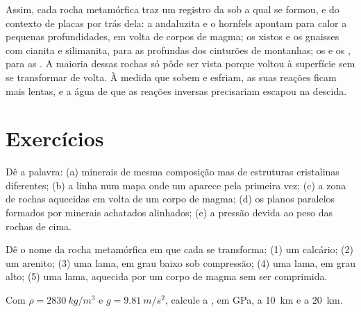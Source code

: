 Assim, cada rocha metamórfica traz um registro da  sob a qual se
formou, e do contexto de placas por trás dela: a andaluzita e o hornfels
apontam para calor a pequenas profundidades, em volta de corpos de magma; os
xistos e os gnaisses com cianita e silimanita, para as  profundas dos
cinturões de montanhas; os  e os , para as . A maioria dessas rochas só pôde ser vista porque voltou à
superfície sem se transformar de volta. À medida que sobem e esfriam, as
suas reações ficam mais lentas, e a água de que as reações inversas
precisariam escapou na descida.

\section{Exercícios}

\begin{exercise}[$\star$]\label{exo:g12:metamorphic-rocks:1}
Dê a palavra: (a) minerais de mesma composição mas de estruturas
cristalinas diferentes; (b) a linha num mapa onde um  aparece
pela primeira vez; (c) a zona de rochas aquecidas em volta de um corpo de
magma; (d) os planos paralelos formados por minerais achatados alinhados;
(e) a pressão devida ao peso das rochas de cima.
\end{exercise}

\begin{exercise}[$\star$]\label{exo:g12:metamorphic-rocks:2}
Dê o nome da rocha metamórfica em que cada  se transforma: (1) um
calcário; (2) um arenito; (3) uma lama, em grau baixo sob compressão; (4)
uma lama, em grau alto; (5) uma lama, aquecida por um corpo de magma sem
ser comprimida.
\end{exercise}

\begin{exercise}[$\star$]\label{exo:g12:metamorphic-rocks:3}
Com $\rho = \qty{2830}{kg/m^3}$ e $g = \qty{9.81}{m/s^2}$, calcule a
, em \unit{GPa}, a \qty{10}{km} e a \qty{20}{km}.
\end{exercise}

